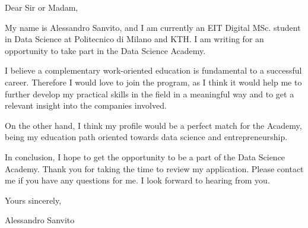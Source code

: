 

\begin{cvparagraph}

Dear Sir or Madam,

My name is Alessandro Sanvito, and I am currently an EIT Digital MSc. student in Data Science at Politecnico di Milano and KTH. I am writing for an opportunity to take part in the Data Science Academy.

I believe a complementary work-oriented education is fundamental to a successful career. Therefore I would love to join the program, as I think it would help me to further develop my practical skills in the field in a meaningful way and to get a relevant insight into the companies involved. 

On the other hand, I think my profile would be a perfect match for the Academy, being my education path oriented towards data science and entrepreneurship.

In conclusion, I hope to get the opportunity to be a part of the Data Science Academy. Thank you for taking the time to review my application. Please contact me if you have any questions for me. I look forward to hearing from you.

Yours sincerely,

Alessandro Sanvito
\end{cvparagraph}
